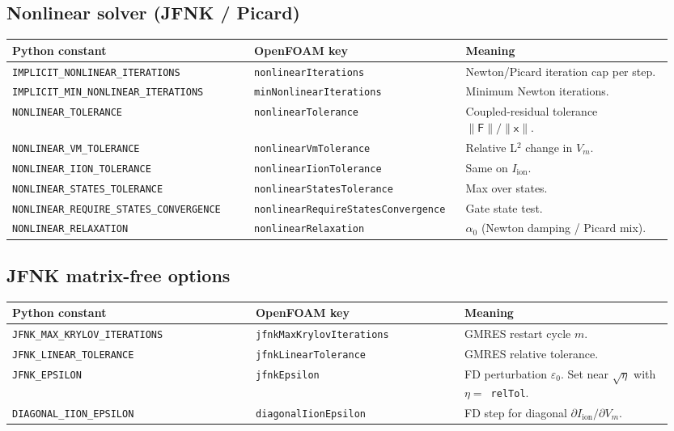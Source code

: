 \documentclass[11pt,a4paper]{article}
\newcommand{\Vm}{V_{m}}
\newcommand{\Iion}{I_{\text{ion}}}
\newcommand{\code}[1]{\texttt{\small #1}}
\begin{document}
\subsection{Nonlinear solver (JFNK / Picard)}
\begin{longtable}{@{}p{0.35\linewidth}p{0.30\linewidth}p{0.30\linewidth}@{}}
\toprule
Python constant & OpenFOAM key & Meaning \\
\midrule \endhead
\code{IMPLICIT\_NONLINEAR\_ITERATIONS} & \code{nonlinearIterations} &
   Newton/Picard iteration cap per step. \\
\code{IMPLICIT\_MIN\_NONLINEAR\_ITERATIONS} &
   \code{minNonlinearIterations} & Minimum Newton iterations. \\
\code{NONLINEAR\_TOLERANCE} & \code{nonlinearTolerance} &
   Coupled-residual tolerance
   $\lVert\mathsf{F}\rVert/\lVert\mathsf{x}\rVert$. \\
\code{NONLINEAR\_VM\_TOLERANCE} & \code{nonlinearVmTolerance} &
   Relative L$^{2}$ change in $\Vm$. \\
\code{NONLINEAR\_IION\_TOLERANCE} & \code{nonlinearIionTolerance} &
   Same on $\Iion$. \\
\code{NONLINEAR\_STATES\_TOLERANCE} &
   \code{nonlinearStatesTolerance} & Max over states. \\
\code{NONLINEAR\_REQUIRE\_STATES\_CONVERGENCE} &
   \code{nonlinearRequireStatesConvergence} & Gate state test. \\
\code{NONLINEAR\_RELAXATION} & \code{nonlinearRelaxation} &
   $\alpha_{0}$ (Newton damping / Picard mix). \\
\bottomrule
\end{longtable}

\subsection{JFNK matrix-free options}
\begin{longtable}{@{}p{0.35\linewidth}p{0.30\linewidth}p{0.30\linewidth}@{}}
\toprule
Python constant & OpenFOAM key & Meaning \\
\midrule \endhead
\code{JFNK\_MAX\_KRYLOV\_ITERATIONS} & \code{jfnkMaxKrylovIterations} &
   GMRES restart cycle $m$. \\
\code{JFNK\_LINEAR\_TOLERANCE} & \code{jfnkLinearTolerance} &
   GMRES relative tolerance. \\
\code{JFNK\_EPSILON} & \code{jfnkEpsilon} &
   FD perturbation $\varepsilon_{0}$. Set near $\sqrt{\eta}$ with
   $\eta = $~\code{relTol}. \\
\code{DIAGONAL\_IION\_EPSILON} & \code{diagonalIionEpsilon} &
   FD step for diagonal $\partial \Iion/\partial \Vm$. \\
\bottomrule
\end{longtable}
\end{document}
